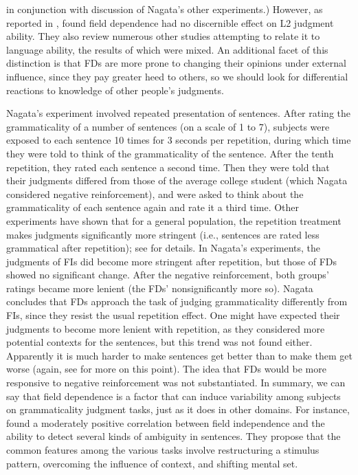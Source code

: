 in conjunction with discussion of Nagata's other experiments.) However, as reported in , \citet{MasnyEtAl1985} found field dependence had no discernible effect on L2 judgment ability. They also review numerous other studies attempting to relate it to language ability, the results of which were mixed. An additional facet of this distinction is that FDs are more prone to changing their opinions under external influence, since they pay greater heed to others, so we should look for differential reactions to knowledge of other people's judgments.

Nagata's experiment involved repeated presentation of sentences. After rating the grammaticality of a number of sentences (on a scale of 1 to 7), subjects were exposed to each sentence 10 times for 3 seconds per repetition, during which time they were told to think of the grammaticality of the sentence. After the tenth repetition, they rated each sentence a second time. Then they were told that their judgments differed from those of the average college student (which Nagata considered negative reinforcement), and were asked to think about the grammaticality of each sentence again and rate it a third time. Other experiments have shown that for a general population, the repetition treatment makes judgments significantly more stringent (i.e., sentences are rated less grammatical after repetition); see  for details. In Nagata's experiments, the judgments of FIs did become more stringent after repetition, but those of FDs showed no significant change. After the negative reinforcement, both groups' ratings became more lenient (the FDs' nonsignificantly more so). Nagata concludes that FDs approach the task of judging grammaticality differently from FIs, since they resist the usual repetition effect. One might have expected their judgments to become more lenient with repetition, as they considered more potential contexts for the sentences, but this trend was not found either. Apparently it is much harder to make sentences get better than to make them get worse (again, see  for more on this point). The idea that FDs would be more responsive to negative reinforcement was not substantiated. In summary, we can say that field dependence is a factor that can induce variability among subjects on grammaticality judgment tasks, just as it does in other domains. For instance, \citet{LefeverEtAl1976} found a moderately positive correlation between field independence and the ability 
to detect several kinds of ambiguity in sentences. They propose that the common features among the various tasks involve restructuring a stimulus pattern, overcoming the influence of context, and shifting mental set.

